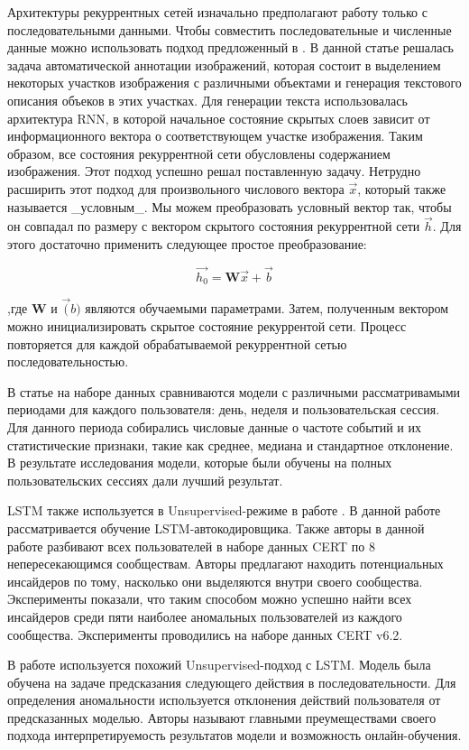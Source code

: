Архитектуры рекуррентных сетей изначально предполагают работу только с последовательными данными. Чтобы совместить последовательные и численные данные можно использовать подход предложенный в \cite{karpathyDeepVisualSemanticAlignments2015}. В данной статье решалась задача автоматической аннотации изображений, которая состоит в выделением некоторых участков изображения с различными объектами и генерация текстового описания объеков в этих участках. Для генерации текста использовалась архитектура RNN, в которой начальное состояние скрытых слоев зависит от информационного вектора о соответствующем участке изображения. Таким образом, все состояния рекуррентной сети обусловлены содержанием изображения. Этот подход успешно решал поставленную задачу.
Нетрудно расширить этот подход для произвольного числового вектора $\overrightarrow{x}$, который также называется _условным_. Мы можем преобразовать условный вектор так, чтобы он совпадал по размеру с вектором скрытого состояния рекуррентной сети $\overrightarrow{h}$. Для этого достаточно применить следующее простое преобразование:

$$\overrightarrow{h_0} = \textbf{W}\overrightarrow{x} + \overrightarrow{b}$$

,где $\textbf{W}$ и $\overrightarrow(b)$ являются обучаемыми параметрами. Затем, полученным вектором можно инициализировать скрытое состояние рекуррентой сети. Процесс повторяется для каждой обрабатываемой рекуррентной сетью последовательностью.

В статье \cite{leAnalyzingDataGranularity2020b} на наборе данных сравниваются модели с различными рассматривамыми периодами для каждого пользователя: день, неделя и пользовательская сессия. Для данного периода собирались числовые данные о частоте событий и их статистические признаки, такие как среднее, медиана и стандартное отклонение. В результате исследования модели, которые были обучены на полных пользовательских сессиях дали лучший результат.

LSTM также используется в Unsupervised-режиме в работе \cite{paulLACLSTMAUTOENCODER}. В данной работе рассматривается обучение LSTM-автокодировщика. Также авторы в данной работе разбивают всех пользователей в наборе данных CERT по 8 непересекающимся сообществам. Авторы предлагают находить потенциальных инсайдеров по тому, насколько они выделяются внутри своего сообщества. Эксперименты показали, что таким способом можно успешно найти всех инсайдеров среди пяти наиболее аномальных пользователей из каждого сообщества. Эксперименты проводились на наборе данных CERT v6.2.

В работе \cite{tuorDeepLearningUnsupervised2017} используется похожий Unsupervised-подход с LSTM. Модель была обучена на задаче предсказания следующего действия в последовательности. Для определения аномальности используется отклонения действий пользователя от предсказанных моделью. Авторы называют главными преумеществами своего подхода интерпретируемость результатов модели и возможность онлайн-обучения.
